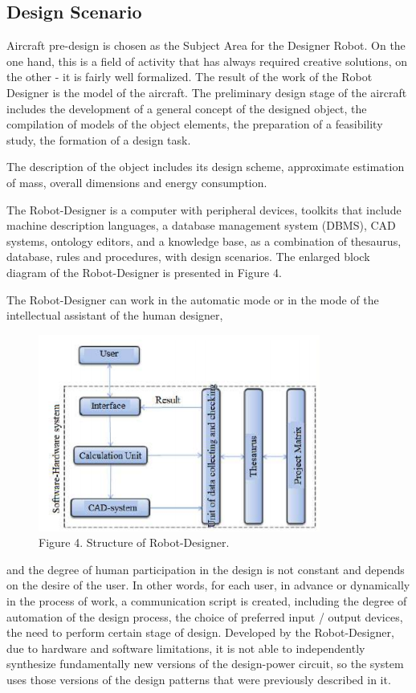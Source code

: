 \documentclass[8pt,twocolumn]{article}
\begin{document}
\subsection{Design Scenario}
Aircraft pre-design is chosen as the Subject Area for the Designer Robot. On the one hand, this is a field of activity that has always required creative solutions, on the other - it is fairly well formalized. The result of the work of the Robot Designer is the model of the aircraft. The preliminary design stage of the aircraft includes the development of a general concept of the designed object, the compilation of models of the object elements, the preparation of a feasibility study, the formation of a design task.

The description of the object includes its design scheme, approximate estimation of mass, overall dimensions and energy consumption.

The Robot-Designer is a computer with peripheral devices, toolkits that include machine description languages, a database management system (DBMS), CAD systems, ontology editors, and a knowledge base, as a combination of thesaurus, database, rules and procedures, with design scenarios. The enlarged block diagram of the Robot-Designer is presented in Figure 4. 

The Robot-Designer can work in the automatic mode or in the mode of the intellectual assistant of the human designer,\begin{figure}[h!]
    \centering
    \includegraphics[scale=0.7]{Figure4.png}
    \caption{Figure 4. Structure of Robot-Designer.}
    \label{Fig4:image}
\end{figure}
and the degree of human participation in the design is not constant and depends on the desire of the user. In other words, for each user, in advance or dynamically in the process of work, a communication script is created, including the degree of automation of the design process, the choice of preferred input / output devices, the need to perform certain stage of design. Developed by the Robot-Designer, due to hardware and software limitations, it is not able to independently synthesize fundamentally new versions of the design-power circuit, so the system uses those versions of the design patterns that were previously described in it.
\end{document}
